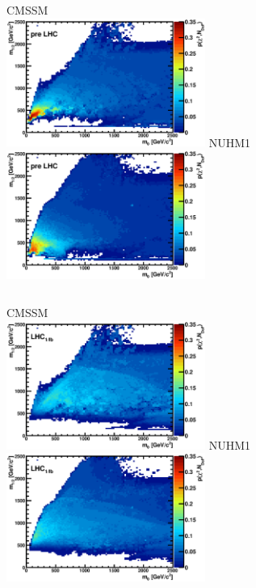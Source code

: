 \documentclass{beamer}
\begin{document}
\begin{frame}{\insertsubsection}
\begin{columns}[l]
    CMSSM\\
    \includegraphics[height=4.2cm]{m0m12_cmssm_px_pre.eps}
    NUHM1\\
    \includegraphics[height=4.2cm]{m0m12_nuhm1_px_pre.eps}\\
\end{columns}
\end{frame}

\begin{frame}{\insertsubsection}
\begin{columns}[l]
    CMSSM\\
    \includegraphics[height=4.2cm]{m0m12_cmssm_px_eps_comp.eps}
    NUHM1\\
    \includegraphics[height=4.2cm]{m0m12_nuhm1_px_eps_comp.eps}\\
\end{columns}
\end{frame}
\end{document}
